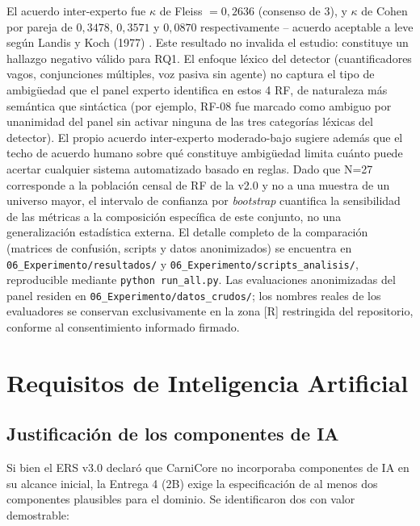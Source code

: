 \documentclass[11pt,a4paper]{article}
\begin{document}
El acuerdo inter-experto fue $\kappa$ de Fleiss $=0{,}2636$ (consenso de 3), y $\kappa$ de Cohen por pareja de $0{,}3478$, $0{,}3571$ y $0{,}0870$ respectivamente -- acuerdo aceptable a leve según Landis y Koch (1977) \cite{cohen1960kappa,fleiss1971kappa}. Este resultado no invalida el estudio: constituye un hallazgo negativo válido para RQ1. El enfoque léxico del detector (cuantificadores vagos, conjunciones múltiples, voz pasiva sin agente) no captura el tipo de ambigüedad que el panel experto identifica en estos 4 RF, de naturaleza más semántica que sintáctica (por ejemplo, RF-08 fue marcado como ambiguo por unanimidad del panel sin activar ninguna de las tres categorías léxicas del detector). El propio acuerdo inter-experto moderado-bajo sugiere además que el techo de acuerdo humano sobre qué constituye ambigüedad limita cuánto puede acertar cualquier sistema automatizado basado en reglas. Dado que N=27 corresponde a la población censal de RF de la v2.0 y no a una muestra de un universo mayor, el intervalo de confianza por \textit{bootstrap} cuantifica la sensibilidad de las métricas a la composición específica de este conjunto, no una generalización estadística externa. El detalle completo de la comparación (matrices de confusión, scripts y datos anonimizados) se encuentra en \texttt{06\_Experimento/resultados/} y \texttt{06\_Experimento/scripts\_analisis/}, reproducible mediante \texttt{python run\_all.py}. Las evaluaciones anonimizadas del panel residen en \texttt{06\_Experimento/datos\_crudos/}; los nombres reales de los evaluadores se conservan exclusivamente en la zona [R] restringida del repositorio, conforme al consentimiento informado firmado.

\section{Requisitos de Inteligencia Artificial}

\subsection{Justificación de los componentes de IA}

Si bien el ERS v3.0 declaró que CarniCore no incorporaba componentes de IA en su alcance inicial, la Entrega 4 (2B) exige la especificación de al menos dos componentes plausibles para el dominio. Se identificaron dos con valor demostrable:
\end{document}
